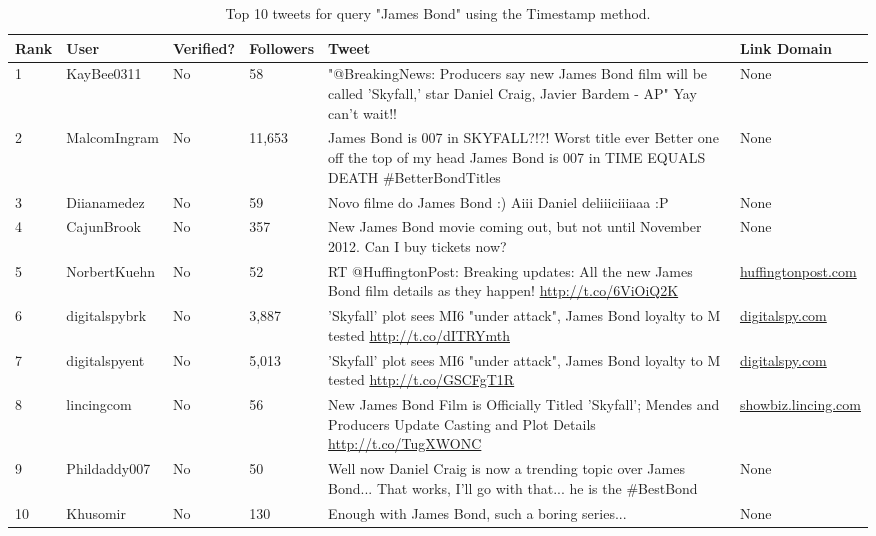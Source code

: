 \documentclass[10pt]{proc}
\begin{document}
    \begin{table*}[t]
      \begin{tabular}{| l | l | l | l | p{6.5cm} | p{2cm} |}
        \hline
        Rank & User & Verified? & Followers & Tweet & Link Domain \\
        \hline
        1 & KayBee0311 & No & 58 & "@BreakingNews: Producers say new James Bond film will be called 'Skyfall,' star Daniel Craig, Javier Bardem - AP" Yay can't wait!! & None \\
        \hline
        2 & MalcomIngram & No & 11,653 & James Bond is 007 in SKYFALL?!?! Worst title ever Better one off the top of my head James Bond is 007 in TIME EQUALS DEATH \#BetterBondTitles & None \\
        \hline
        3 & Diianamedez & No & 59 & Novo filme do James Bond :) Aiii Daniel deliiiciiiaaa :P & None \\
        \hline
        4 & CajunBrook & No & 357 & New James Bond movie coming out, but not until November 2012. Can I buy tickets now? & None \\
        \hline
        5 & NorbertKuehn & No & 52 & RT @HuffingtonPost: Breaking updates: All the new James Bond film details as they happen! \url{http://t.co/6ViOiQ2K} & \url{huffingtonpost.com} \\
        \hline
        6 & digitalspybrk & No & 3,887 & 'Skyfall' plot sees MI6 "under attack", James Bond loyalty to M tested \url{http://t.co/dITRYmth} & \url{digitalspy.com} \\
        \hline
        7 & digitalspyent & No & 5,013 & 'Skyfall' plot sees MI6 "under attack", James Bond loyalty to M tested \url{http://t.co/GSCFgT1R} & \url{digitalspy.com} \\
        \hline
        8 & lincingcom & No & 56 & New James Bond Film is Officially Titled 'Skyfall'; Mendes and Producers Update Casting and Plot Details \url{http://t.co/TugXWONC} & \url{showbiz.lincing.com} \\
        \hline
        9 & Phildaddy007 & No & 50 & Well now Daniel Craig is now a trending topic over James Bond... That works, I'll go with that... he is the \#BestBond & None \\
        \hline
        10 & Khusomir & No & 130 & Enough with James Bond, such a boring series... & None \\
        \hline
      \end{tabular}
      \caption{Top 10 tweets for query "James Bond" using the Timestamp method.}
      \label{BondTimestamp}      
    \end{table*}
    
\end{document}

